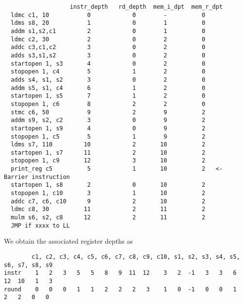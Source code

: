 \begin{verbatim}
                   instr_depth   rd_depth  mem_i_dpt  mem_r_dpt
  ldmc c1, 10           0            0        -          0
  ldms s8, 20           1            0        1          0
  addm s1,s2,c1         2            0        1          0
  ldmc c2, 30           2            0        2          0
  addc c3,c1,c2         3            0        2          0
  adds s3,s1,s2         3            0        2          0
  startopen 1, s3       4            0        2          0
  stopopen 1, c4        5            1        2          0
  adds s4, s1, s2       3            0        2          0
  addm s5, s1, c4       6            1        2          0
  startopen 1, s5       7            1        2          0
  stopopen 1, c6        8            2        2          0
  stmc c6, 50           9            2        9          2
  addm s9, s2, c2       3            0        9          2
  startopen 1, s9       4            0        9          2
  stopopen 1, c5        5            1        9          2
  ldms s7, 110         10            2       10          2
  startopen 1, s7      11            2       10          2
  stopopen 1, c9       12            3       10          2
  print_reg c5          5            1       10          2   <- Barrier instruction
  startopen 1, s8       2            0       10          2
  stopopen 1, c10       3            1       10          2
  addc c7, c6, c10      9            2       10          2
  ldmc c8, 30          11            2       11          2
  mulm s6, s2, c8      12            2       11          2
  JMP if xxxx to LL
\end{verbatim}
We obtain the associated register depths as
\begin{verbatim}
        c1, c2, c3, c4, c5, c6, c7, c8, c9, c10, s1, s2, s3, s4, s5, s6, s7, s8, s9
instr    1   2   3   5   5   8   9  11  12    3   2  -1   3   3   6  12  10   1   3
round    0   0   0   1   1   2   2   2   3    1   0  -1   0   0   1   2   2   0   0
\end{verbatim}

